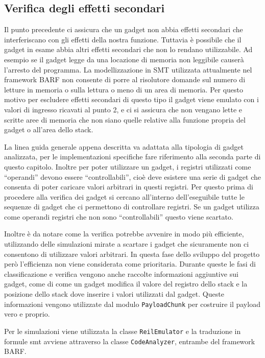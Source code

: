 \subsection{Verifica degli effetti secondari}  

Il punto precedente ci assicura che un gadget non abbia effetti
secondari che interferiscano con gli effetti della nostra
funzione. Tuttavia è possibile che il gadget in esame abbia altri
effetti secondari che non lo rendano utilizzabile. Ad esempio se il
gadget legge da una locazione di memoria non leggibile causerà
l'arresto del programma. La modellizzazione in SMT utilizzata
attualmente nel framework BARF non consente di porre al risolutore
domande sul numero di letture in memoria o sulla lettura o meno di
un area di memoria. Per questo motivo per escludere effetti
secondari di questo tipo il gadget viene emulato con i valori di
ingresso ricavati al punto 2, e ci si assicura che non vengano lette
e scritte aree di memoria che non siano quelle relative alla
funzione propria del gadget o all'area dello stack.


La linea guida generale appena descritta va adattata alla tipologia di
gadget analizzata, per le implementazioni specifiche fare riferimento
alla seconda parte di questo capitolo. Inoltre per poter utilizzare un
gadget, i registri utilizzati come ``operandi'' devono essere
``controllabili'', cioè deve esistere una serie di gadget che consenta
di poter caricare valori arbitrari in questi registri. Per questo
prima di procedere alla verifica dei gadget si cercano all'interno
dell'eseguibile tutte le sequenze di gadget che ci permettono di
controllare registri. Se un gadget utilizza come operandi registri che
non sono ``controllabili'' questo viene scartato.

Inoltre è da notare come la verifica potrebbe avvenire in modo più
efficiente, utilizzando delle simulazioni mirate a scartare i gadget
che sicuramente non ci consentono di utilizzare valori arbitrari. In
questa fase dello sviluppo del progetto però l'efficienza non viene
considerata come prioritaria.  Durante queste le fasi di
classificazione e verifica vengono anche raccolte informazioni
aggiuntive sui gadget, come di come un gadget modifica il valore del
registro dello stack e la posizione dello stack dove inserire i valori
utilizzati dal gadget. Queste informazioni vengono utilizzate dal
modulo \lstinline{PayloadChunk} per costruire il payload vero e proprio.


Per le simulazioni viene utilizzata la classe \lstinline{ReilEmulator}
e la traduzione in formule smt avviene attraverso la classe
\lstinline{CodeAnalyzer}, entrambe del framework BARF.


